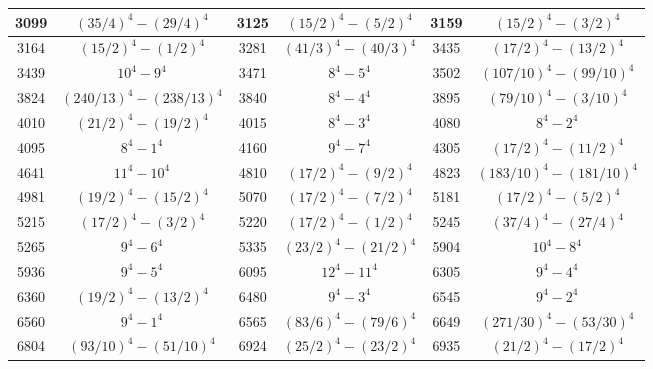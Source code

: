 \documentclass[a4paper,12pt,english,reqno]{amsart}
\begin{document}
\begin{table}
\begin{center}
\begin{tabular}{|c|c||c|c||c|c|}
3099 & $(35/4)^4-( 29/4)^4$ & %
3125& $(15/2)^4-(5/2)^4$ &
3159& $(15/2)^4-(3/2)^4$ \\\hline
3164 & $(15/2)^4  -(1/2 )^4$ & %
3281& $(41/3)^4-(40/3)^4$ &
3435 &$(17/2)^4-(13/2 )^4$  \\\hline
3439 & $ 10^4- 9^4$ & %
3471& $8^4  -5^4$ &
3502 & $(107/10)^4-(99/10 )^4$  \\\hline
3824 &$(240/13)^4-(238/13)^4$ &
3840 &$8^4-4^4$ &
3895 & $(79/10)^4 -( 3/10 )^4$  \\\hline
4010& $(21/2)^4-(19/2)^4$  &
4015& $8^4  -3^4$ & %
4080 & $8^4-2^4$ \\\hline
4095 &$ 8^4- 1^4$ & %
4160 &$9^4- 7^4$ &
4305 &$(17/2)^4 -(11/2)^4$ \\\hline
4641 &$11^4 - 10^4$ & %
4810& $(17/2)^4 -(9/2 )^4$ & %
4823& $(183/10)^4-( 181/10 )^4$ \\\hline
4981 &$(19/2)^4-( 15/2 )^4$  & %
5070& $(17/2)^4 - (7/2)^4$ & %
5181& $(17/2)^4 -(5/2)^4$ \\\hline
5215& $(17/2)^4-( 3/2)^4$ & %
5220 & $(17/2)^4- ( 1/2 )^4$ & %
5245& $(37/4)^4  -(27/4 )^4$ \\\hline
5265 & $9^4  -6^4$& 
5335& $(23/2)^4  -(21/2)^4$ & %
5904 &$10^4 -8^4$ \\\hline
5936 &$9^4-5^4$&
6095 & $12^4  -11^4$ & %
6305 & $9^4 -4^4$ \\\hline
6360 & $(19/2)^4- (13/2 )^4$ & %
6480& $9^4-3^4$ &
6545& $9^4- 2^4$ \\\hline
6560& $9^4-1^4$ &
6565 &$(83/6)^4-( 79/6 )^4$ &
6649& $(271/30)^4-( 53/30 )^4$   \\\hline
6804 &$(93/10)^4-(51/10)^4$&
6924& $(25/2)^4-( 23/2 )^4$ & %
6935& $(21/2)^4- (17/2 )^4$ \\\hline

\end{tabular}
\end{center}
\end{table}
\end{document}
